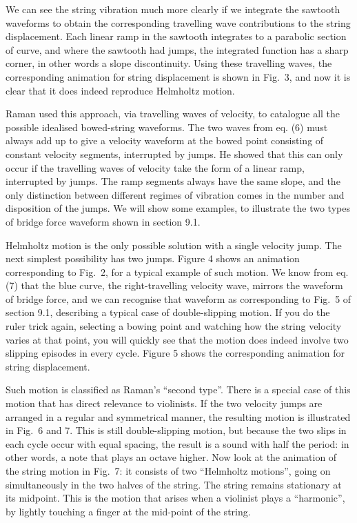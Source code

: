   We can see the string vibration much more clearly if we integrate the 
  sawtooth waveforms to obtain the corresponding travelling wave contributions 
  to the string displacement. Each linear ramp in the sawtooth integrates to a 
  parabolic section of curve, and where the sawtooth had jumps, the integrated 
  function has a sharp corner, in other words a slope discontinuity. Using 
  these travelling waves, the corresponding animation for string displacement 
  is shown in Fig.\ 3, and now it is clear that it does indeed reproduce 
  Helmholtz motion. 

  Raman used this approach, via travelling waves of velocity, to catalogue all 
  the possible idealised bowed-string waveforms. The two waves from eq. (6) 
  must always add up to give a velocity waveform at the bowed point consisting 
  of constant velocity segments, interrupted by jumps. He showed that this can 
  only occur if the travelling waves of velocity take the form of a linear 
  ramp, interrupted by jumps. The ramp segments always have the same slope, and 
  the only distinction between different regimes of vibration comes in the 
  number and disposition of the jumps. We will show some examples, to 
  illustrate the two types of bridge force waveform shown in section 9.1. 

  Helmholtz motion is the only possible solution with a single velocity jump. 
  The next simplest possibility has two jumps. Figure 4 shows an animation 
  corresponding to Fig.\ 2, for a typical example of such motion. We know from 
  eq. (7) that the blue curve, the right-travelling velocity wave, mirrors the 
  waveform of bridge force, and we can recognise that waveform as corresponding 
  to Fig.\ 5 of section 9.1, describing a typical case of double-slipping 
  motion. If you do the ruler trick again, selecting a bowing point and 
  watching how the string velocity varies at that point, you will quickly see 
  that the motion does indeed involve two slipping episodes in every cycle. 
  Figure 5 shows the corresponding animation for string displacement. 

  Such motion is classified as Raman's ``second type''. There is a special case 
  of this motion that has direct relevance to violinists. If the two velocity 
  jumps are arranged in a regular and symmetrical manner, the resulting motion 
  is illustrated in Fig.\ 6 and 7. This is still double-slipping motion, but 
  because the two slips in each cycle occur with equal spacing, the result is a 
  sound with half the period: in other words, a note that plays an octave 
  higher. Now look at the animation of the string motion in Fig.\ 7: it 
  consists of two ``Helmholtz motions'', going on simultaneously in the two 
  halves of the string. The string remains stationary at its midpoint. This is 
  the motion that arises when a violinist plays a ``harmonic'', by lightly 
  touching a finger at the mid-point of the string. 

